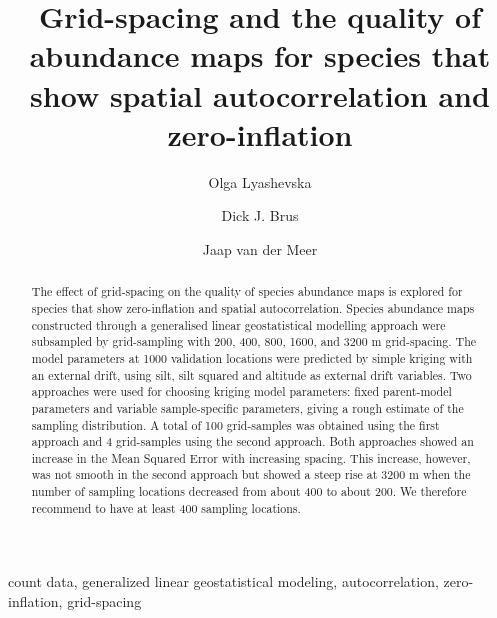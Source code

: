 \documentclass[review]{elsarticle}
\begin{document}
\begin{frontmatter}

\title{Grid-spacing and the quality of abundance maps for species that show spatial autocorrelation and zero-inflation}

\author[1]{Olga Lyashevska}

\author[2]{Dick J. Brus}

\author[1]{Jaap van der Meer}


\address[1]{Department of Marine Ecology\\
NIOZ Royal Netherlands Institute for Sea Research\\
P.O. Box 59 1790 AB Den Burg\\
Texel, The Netherlands}

\address[2]{Alterra, Wageningen University and Research Centre\\
P.O. Box 47, 6700AA\\
Wageningen, The Netherlands}

\begin{abstract}
The effect of grid-spacing on the quality of species abundance maps is explored for species that show zero-inflation and spatial autocorrelation.
Species abundance maps constructed through a generalised linear geostatistical modelling approach were subsampled by grid-sampling with 200, 400, 800, 1600, and 3200 m grid-spacing.
The model parameters at 1000 validation locations were predicted by simple kriging with an external drift, using silt, silt squared and altitude as external drift variables.
Two approaches were used for choosing kriging model parameters: fixed parent-model parameters and variable sample-specific parameters, giving a rough estimate of the sampling distribution.
A total of 100 grid-samples was obtained using the first approach and 4 grid-samples using the second approach.
Both approaches showed an increase in the Mean Squared Error with increasing spacing.
This increase, however,  was not smooth in the second approach but showed a steep rise at 3200 m when the number of sampling locations decreased from about 400 to about 200.
We therefore recommend to have at least 400 sampling locations.
\end{abstract}

\begin{keyword}
count data, generalized linear geostatistical modeling, autocorrelation, zero-inflation, grid-spacing
\end{keyword}

\end{frontmatter}
\end{document}
